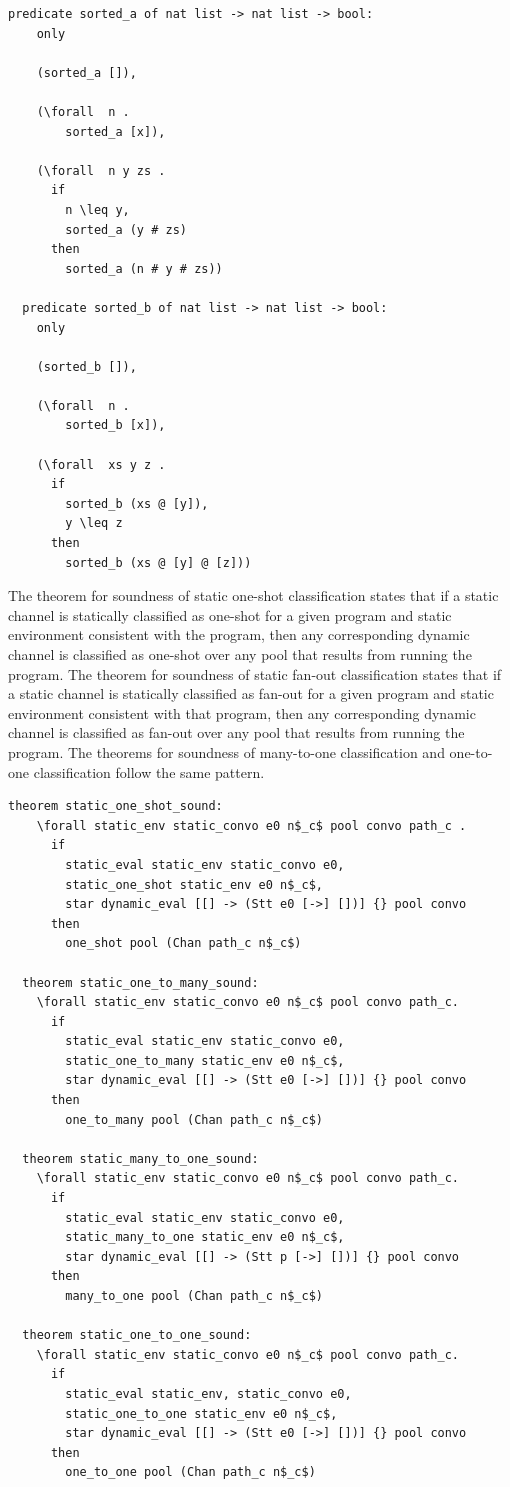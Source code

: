 \documentclass[10pt]{article}
\begin{document}
\begin{lstlisting}[language=logic, mathescape]
  predicate sorted_a of nat list -> nat list -> bool:
    only

    (sorted_a []),

    (\forall  n .
        sorted_a [x]),

    (\forall  n y zs .
      if 
        n \leq y,
        sorted_a (y # zs)
      then
        sorted_a (n # y # zs))

  predicate sorted_b of nat list -> nat list -> bool:
    only

    (sorted_b []),

    (\forall  n .
        sorted_b [x]),

    (\forall  xs y z .
      if 
        sorted_b (xs @ [y]),
        y \leq z 
      then
        sorted_b (xs @ [y] @ [z]))
  \end{lstlisting}

The theorem for soundness of static one-shot classification states that if a static channel is
statically classified as one-shot for a given program and
static environment consistent with the
program, then any corresponding dynamic channel is classified
as one-shot over any pool that results
from running the program. The theorem for soundness of
static fan-out classification states that if
a static channel is statically classified as fan-out for a given program and static environment
consistent with that program, then any corresponding dynamic channel is classified as fan-out
over any pool that results from running the program.  The theorems for soundness of many-to-one
classification and one-to-one classification follow the same pattern. 

\begin{lstlisting}[language=logic, mathescape]
  theorem static_one_shot_sound: 
    \forall static_env static_convo e0 n$_c$ pool convo path_c .
      if
        static_eval static_env static_convo e0, 
        static_one_shot static_env e0 n$_c$, 
        star dynamic_eval [[] -> (Stt e0 [->] [])] {} pool convo
      then
        one_shot pool (Chan path_c n$_c$)

  theorem static_one_to_many_sound:
    \forall static_env static_convo e0 n$_c$ pool convo path_c. 
      if 
        static_eval static_env static_convo e0, 
        static_one_to_many static_env e0 n$_c$, 
        star dynamic_eval [[] -> (Stt e0 [->] [])] {} pool convo
      then
        one_to_many pool (Chan path_c n$_c$)

  theorem static_many_to_one_sound:
    \forall static_env static_convo e0 n$_c$ pool convo path_c. 
      if
        static_eval static_env static_convo e0, 
        static_many_to_one static_env e0 n$_c$, 
        star dynamic_eval [[] -> (Stt p [->] [])] {} pool convo
      then
        many_to_one pool (Chan path_c n$_c$)

  theorem static_one_to_one_sound:
    \forall static_env static_convo e0 n$_c$ pool convo path_c. 
      if
        static_eval static_env, static_convo e0, 
        static_one_to_one static_env e0 n$_c$,
        star dynamic_eval [[] -> (Stt e0 [->] [])] {} pool convo
      then
        one_to_one pool (Chan path_c n$_c$)
\end{lstlisting}
\end{document}
